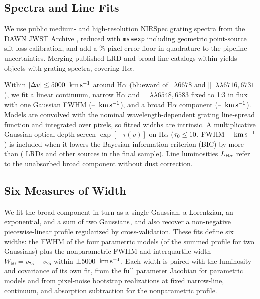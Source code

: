 \documentclass[twocolumn,linenumbers]{aastex701}
\newcommand{\Ha}{H$\alpha$}
\newcommand{\kms}{\ensuremath{{\rm km\,s^{-1}}}}
\newcommand{\LHa}{L_{\rm H\alpha}}
\begin{document}
\subsection{Spectra and Line Fits} \label{sec:fit}

We use public medium- and high-resolution NIRSpec grating spectra from the DAWN JWST Archive \citep[DJA;][]{DJAHeintz2023,DJAdeGraaff2024}, reduced with \texttt{msaexp} \citep{msaexp} including geometric point-source slit-loss calibration, and add a \errFloor{}\% pixel-error floor in quadrature to the pipeline uncertainties.
Merging published LRD and broad-line catalogs \citep[including][]{Taylor2025,Kocevski2026,Hviding2025,deGraaff2026} within \matchRadius{} yields \NSources{} objects with \NSpectra{} grating spectra, \NSpecHa{} covering \Ha{}.

Within $|\Delta v|\leq5000{}$~\kms{} around \Ha{} (blueward of ~$\lambda6678$ and []~$\lambda\lambda6716,6731$), we fit a linear continuum, narrow \Ha{} and []~$\lambda\lambda6548,6583$ fixed to 1:3 in flux with one Gaussian FWHM (\wnarLo{}--\wnarHi{}~\kms{}), and a broad \Ha{} component (\wbroadLo{}--\wbroadHi{}~\kms{}).
Models are convolved with the nominal wavelength-dependent grating line-spread function \citep[LSF;][]{Jakobsen2022} and integrated over pixels, so fitted widths are intrinsic.
A multiplicative Gaussian optical-depth screen $\exp[-\tau(v)]$ on \Ha{} ($\tau_0\leq10{}$, FWHM \wabsLo{}--\wabsHi{}~\kms{}) is included when it lowers the Bayesian information criterion (BIC) by more than \cutBIC{} (\NAbsLRD{} LRDs and \NAbsOther{} other sources in the final sample).
Line luminosities $\LHa$ refer to the unabsorbed broad component without dust correction.

\subsection{Six Measures of Width} \label{sec:widths}

We fit the broad component in turn as a single Gaussian, a Lorentzian, an exponential, and a sum of two Gaussians, and also recover a non-negative piecewise-linear profile regularized by cross-validation.
These fits define six widths: the FWHM of the four parametric models (of the summed profile for two Gaussians) plus the nonparametric FWHM and interquartile width $W_{50}=v_{75}-v_{25}$ within $\pm5000{}$~\kms{}.
Each width is paired with the luminosity and covariance of its own fit, from the full parameter Jacobian for parametric models and from \nBootNp{} pixel-noise bootstrap realizations at fixed narrow-line, continuum, and absorption subtraction for the nonparametric profile.
\end{document}
